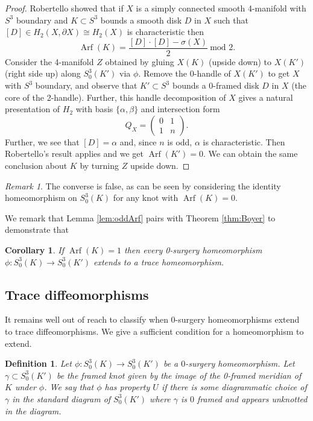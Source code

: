 \documentclass [11pt]{amsart}
\newtheorem {corollary}[theorem]{Corollary}
\newtheorem {definition}[theorem]{Definition}
\theoremstyle{remark}
\newtheorem {remark}[theorem]{Remark}
\def\Arf{\operatorname{Arf}}
\begin{document}
\begin{proof}
Robertello \cite{robertello} showed that if $X$ is a simply connected smooth 4-manifold with $S^3$ boundary and $K\subset S^3$ bounds a smooth disk $D$ in $X$ such that $[D]\in H_2(X,\partial X)\cong H_2(X)$ is characteristic then $$\Arf(K) = \frac{[D]\cdot[D]-\sigma(X)}{2} \ \text{mod 2.}$$ 
Consider the 4-manifold $Z$ obtained by gluing $X(K)$ (upside down) to $X(K')$ (right side up) along $S^3_0(K')$ via $\phi$. Remove the 0-handle of $X(K')$ to get $X$ with $S^3$ boundary, and observe that $K'\subset S^3$ bounds a 0-framed disk $D$ in $X$ (the core of the 2-handle). Further,  this handle decomposition of $X$ gives a natural presentation of $H_2$ with basis $\{\alpha,\beta\}$ and intersection form
$$Q_X=\begin{pmatrix}
0 & 1\\
1 & n
\end{pmatrix}.$$ Further, we see that $[D]=\alpha$ and, since $n$ is odd, $\alpha$ is characteristic. Then Robertello's result applies and we get $\Arf(K')=0$. We can obtain the same conclusion about $K$ by turning $Z$ upside down. 
\end{proof}

\begin{remark}
The converse is false, as can be seen by considering the identity homeomorphism on $S^3_0(K)$ for any knot with $\Arf(K)=0$. 
\end{remark}

We remark that Lemma \ref{lem:oddArf} pairs with Theorem \ref{thm:Boyer} to demonstrate that 
\begin{corollary}
If $\Arf(K)=1$ then every 0-surgery homeomorphism $\phi:S^3_0(K)\to S^3_0(K')$ extends to a trace homeomorphism. 
\end{corollary}


\subsection{Trace diffeomorphisms}
It remains well out of reach to classify when 0-surgery homeomorphisms extend to trace diffeomorphisms.  We give a sufficient condition for a homeomorphism to extend. 

\begin{definition} Let $\phi: S^3_0(K) \to S^3_0(K')$ be a $0$-surgery homeomorphism. Let $\gamma\subset S^3_0(K')$ be the framed knot given by the image of the 0-framed meridian of $K$ under $\phi$. We say that $\phi$ has \emph{property $U$} if there is some diagrammatic choice of $\gamma$ in the standard diagram of $S^3_0(K')$ where  $\gamma$ is $0$ framed and appears unknotted in the diagram. 
\end{definition}
\end{document}
